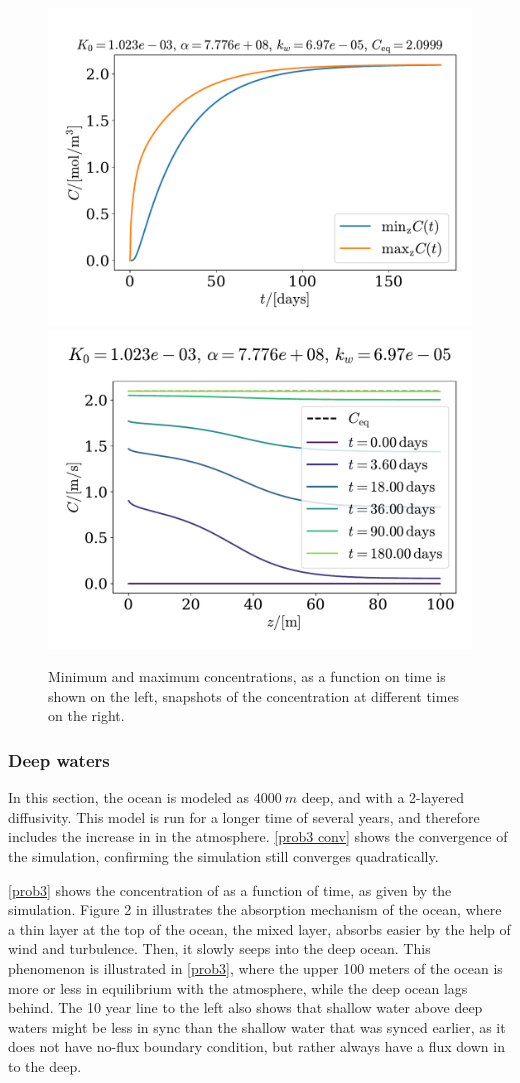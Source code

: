 \documentclass{article}
\begin{document}
    \begin{figure}
        \centering
        \includegraphics[width=.47\textwidth]{../plots/prob2_minmax}
        \includegraphics[width=.52\textwidth]{../plots/prob2_i}
        \caption{Minimum and maximum concentrations, as a function on time is shown on the left, snapshots of the concentration at different times on the right.}
        \label{prob2 minmax}
    \end{figure}

    \subsubsection*{Deep waters}

    In this section, the ocean is modeled as $\SI{4000}{m}$ deep, and with a 2-layered diffusivity. This model is run for a longer time of several years, and therefore includes the increase in  in the atmosphere. \autoref{prob3 conv} shows the convergence of the simulation, confirming the simulation still converges quadratically.

    \autoref{prob3} shows the concentration of  as a function of time, as given by the simulation. Figure 2 in \cite{exercise} illustrates the absorption mechanism of the ocean, where a thin layer at the top of the ocean, the mixed layer, absorbs  easier by the help of wind and turbulence. Then, it slowly seeps into the deep ocean. This phenomenon is illustrated in \autoref{prob3}, where the upper 100 meters of the ocean is more or less in equilibrium with the atmosphere, while the deep ocean lags behind. The 10 year line to the left also shows that shallow water above deep waters might be less in sync than the shallow water that was synced earlier, as it does not have no-flux boundary condition, but rather always have a flux down in to the deep. 
    
\end{document}
